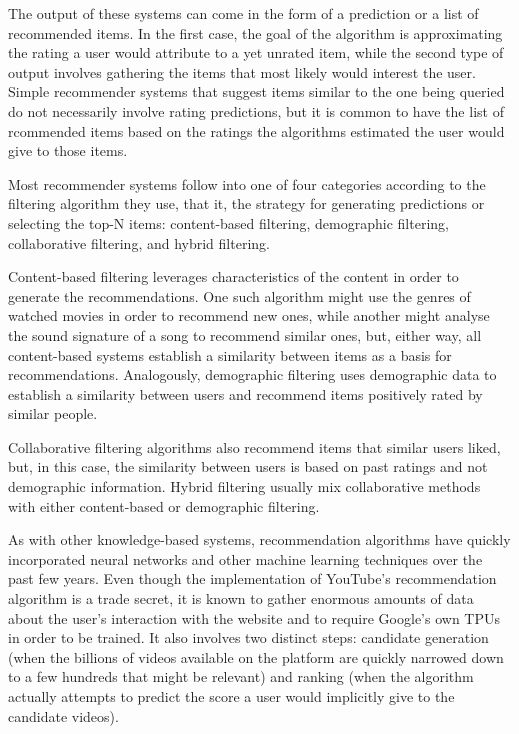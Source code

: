 The output of these systems can come in the form of a prediction or a list of
recommended items. In the first case, the goal of the algorithm is approximating
the rating a user would attribute to a yet unrated item, while the second type
of output involves gathering the items that most likely would interest the user.
Simple recommender systems that suggest items similar to the one being queried
do not necessarily involve rating predictions, but it is common to have the list
of rcommended items based on the ratings the algorithms estimated the user would
give to those items.

Most recommender systems follow into one of four categories according to the
filtering algorithm they use, that it, the strategy for generating predictions
or selecting the top-N items: content-based filtering, demographic filtering,
collaborative filtering, and hybrid filtering.

Content-based filtering leverages characteristics of the content in order to
generate the recommendations. One such algorithm might use the genres of watched
movies in order to recommend new ones, while another might analyse the sound
signature of a song to recommend similar ones, but, either way, all
content-based systems establish a similarity between items as a basis for
recommendations. Analogously, demographic filtering uses demographic data to
establish a similarity between users and recommend items positively rated by
similar people.

Collaborative filtering algorithms also recommend items that similar users
liked, but, in this case, the similarity between users is based on past ratings
and not demographic information. Hybrid filtering usually mix collaborative
methods with either content-based or demographic filtering.

As with other knowledge-based systems, recommendation algorithms have quickly
incorporated neural networks and other machine learning techniques over the past
few years. Even though the implementation of YouTube's recommendation algorithm
is a trade secret, it is known to gather enormous amounts of data about the
user's interaction with the website and to require Google's own TPUs in order to
be trained. It also involves two distinct steps: candidate generation (when the
billions of videos available on the platform are quickly narrowed down to a few
hundreds that might be relevant) and ranking (when the algorithm actually
attempts to predict the score a user would implicitly give to the candidate
videos).

